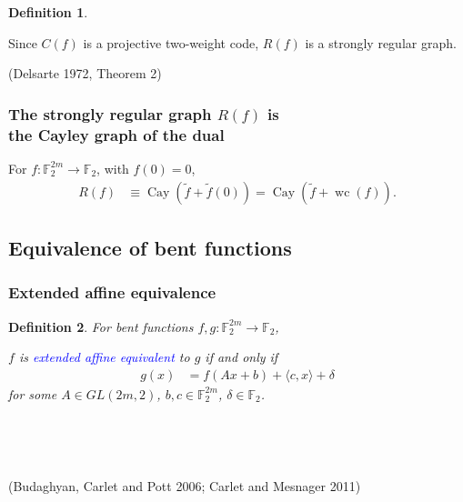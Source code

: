 \documentclass[pdf,sprung,slideColor,nocolorBG]{beamer}
\newenvironment{colortheme}[1]{
\def\ProvidesPackageRCS $##1${\relax}
\renewcommand{\ProcessOptions}{\relax}
\makeatletter

\makeatother
}{}
\newcommand{\slidecite}[1]{\tiny{(#1)}\normalsize{}}
\newcommand{\mb}[1]{\mathbb{#1}}
\newcommand{\Emph}[1]{\emph{\textcolor{blue}{#1}}}
\newcommand{\To}{\rightarrow}
\newcommand{\Cay}[1]{\operatorname{Cay}\left(#1\right)}
\newcommand{\dual}[1]{\widetilde{#1}}
\newcommand{\weightclass}[1]{\operatorname{wc}\left(#1\right)}
\newcommand{\F}{\mb{F}}
\newtheorem{Def}{Definition}
\begin{document}
\begin{colortheme}{seagull}
\begin{frame}
\begin{Def}
\end{Def}
Since $C(f)$ is a projective two-weight code,
$R(f)$ is a strongly regular graph.

\slidecite{Delsarte 1972, Theorem 2}
\end{frame}

\end{colortheme}

\begin{colortheme}{jubata}

\begin{frame}
\frametitle{The strongly regular graph $R(f)$ is \\ the Cayley graph of the dual}

\begin{Theorem}
For $f : \F_2^{2m} \To \F_2$, with $f(0)=0$,
\begin{align*}
R(f) &\equiv \Cay{\dual{f} + \dual{f}(0)} = \Cay{\dual{f} + \weightclass{f}}.
\end{align*}
\end{Theorem}

\end{frame}

\end{colortheme}

\subsection{Equivalence of bent functions}

\begin{colortheme}{seagull}

\begin{frame}
\frametitle{Extended affine equivalence}

\begin{Def}
For bent functions $f,g : \F_2^{2m} \To \F_2$,

$f$ is \Emph{extended affine equivalent} to $g$ if and only if
\begin{align*}
g(x) &= f(A x + b) + \langle c, x \rangle + \delta
\end{align*}
for some $A \in GL(2m,2)$, $b, c \in \F_2^{2m}$, $\delta \in \F_2$.
\end{Def}

~

~

\slidecite{Budaghyan, Carlet and Pott 2006; Carlet and Mesnager 2011}
\end{frame}

\end{colortheme}
\end{document}
